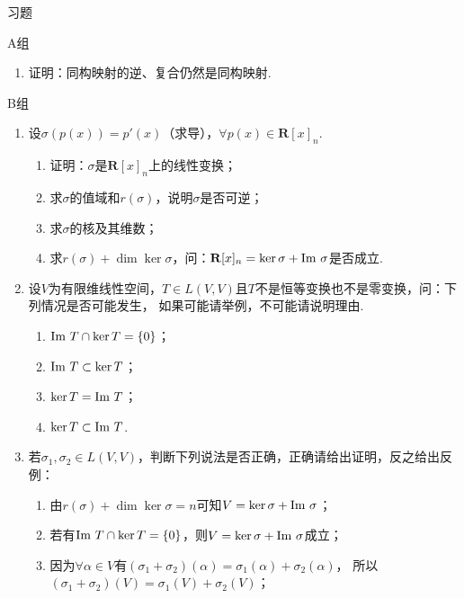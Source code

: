 \centerline{\heiti \Large 习题}
\vspace{2ex}
{\kaishu }
\begin{flushright}
    \kaishu

\end{flushright}
\centerline{\heiti A组}
\begin{enumerate}
    \item 证明：同构映射的逆、复合仍然是同构映射.
\end{enumerate}
\centerline{\heiti B组}
\begin{enumerate}
    \item 设$\sigma(p(x))=p'(x)$（求导），$\forall p(x) \in \mathbf{R}[x]_n$.
	\begin{enumerate}[label=(\arabic*)]
        \item 证明：$\sigma$是$\mathbf{R}[x]_n$上的线性变换；
        \item 求$\sigma$的值域和$r(\sigma)$，说明$\sigma$是否可逆；
        \item 求$\sigma$的核及其维数；
        \item 求$r(\sigma)+\dim\ker\sigma$，问：$\mathbf{R}[x]_n=\ker\sigma+\textup{Im }\sigma$是否成立.
    \end{enumerate}
	\item 设$V$为有限维线性空间，$T\in L(V,V)$且$T$不是恒等变换也不是零变换，问：下列情况是否可能发生，
	如果可能请举例，不可能请说明理由.
    \begin{enumerate}[label=(\arabic*)]
        \item $\textup{Im }T \cap \ker T = \{0\}$；
        \item $\textup{Im }T \subset \ker T$；
        \item $\ker T = \textup{Im }T$；
        \item $\ker T \subset \textup{Im }T$.
    \end{enumerate}
	\item 若$\sigma_1,\sigma_2\in L(V,V)$，判断下列说法是否正确，正确请给出证明，反之给出反例：
	\begin{enumerate}[label=(\arabic*)]
        \item 由$r(\sigma)+\dim\ker\sigma=n$可知$V=\ker\sigma+\textup{Im }\sigma$；
        \item 若有$\textup{Im }T \cap \ker T = \{0\}$，则$V=\ker\sigma+\textup{Im }\sigma$成立；
        \item 因为$\forall \alpha \in V$有$(\sigma_1+\sigma_2)(\alpha)=\sigma_1(\alpha)+\sigma_2(\alpha)$，
        所以$(\sigma_1+\sigma_2)(V)=\sigma_1(V)+\sigma_2(V)$；

\end{enumerate}
\end{enumerate}

